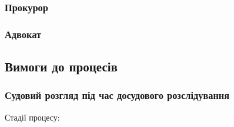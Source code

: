 \documentclass{article}
\begin{document}
\subsubsection{Прокурор}

\subsubsection{Адвокат}

\newpage
\subsection{Вимоги до процесів}

\subsubsection{Судовий розгляд під час досудового розслідування}

Стадії процесу:
\end{document}
